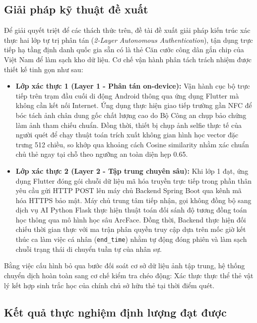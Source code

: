﻿\documentclass[../DoAn.tex]{subfiles}
\begin{document}
\subsection{Giải pháp kỹ thuật đề xuất}

Để giải quyết triệt để các thách thức trên, đề tài đề xuất giải pháp kiến trúc xác thực hai lớp tự trị phân tán (\textit{2-Layer Autonomous Authentication}), tận dụng trực tiếp hạ tầng định danh quốc gia sẵn có là thẻ Căn cước công dân gắn chip của Việt Nam để làm sạch kho dữ liệu. Cơ chế vận hành phân tách trách nhiệm được thiết kế tinh gọn như sau:
\begin{itemize}
    \item \textbf{Lớp xác thực 1 (Layer 1 - Phân tán on-device):} Vận hành cục bộ trực tiếp trên trạm đầu cuối di động Android thông qua ứng dụng Flutter mà không cần kết nối Internet. Ứng dụng thực hiện giao tiếp trường gần NFC để bóc tách ảnh chân dung gốc chất lượng cao do Bộ Công an chụp bảo chứng làm ảnh tham chiếu chuẩn. Đồng thời, thiết bị chụp ảnh selfie thực tế của người quét để chạy thuật toán trích xuất không gian hình học vector đặc trưng 512 chiều, so khớp qua khoảng cách Cosine similarity nhằm xác chuẩn chủ thẻ ngay tại chỗ theo ngưỡng an toàn diện hẹp 0.65.
    \item \textbf{Lớp xác thực 2 (Layer 2 - Tập trung chuyên sâu):} Khi lớp 1 đạt, ứng dụng Flutter đóng gói chuỗi dữ liệu mã hóa truyền trực tiếp trong phần thân yêu cầu gửi HTTP POST lên máy chủ Backend Spring Boot qua kênh mã hóa HTTPS bảo mật. Máy chủ trung tâm tiếp nhận, gọi không đồng bộ sang dịch vụ AI Python Flask thực hiện thuật toán đối sánh độ tương đồng toán học thông qua mô hình học sâu ArcFace. Đồng thời, Backend thực hiện đối chiếu thời gian thực với ma trận phân quyền truy cập  dựa trên mốc giờ kết thúc ca làm việc cá nhân (\texttt{end\_time}) nhằm tự động đóng phiên và làm sạch chuỗi trạng thái di chuyển tuần tự của nhân sự.
\end{itemize}

Bằng việc cấu hình bỏ qua bước đối soát cơ sở dữ liệu ảnh tập trung, hệ thống chuyển dịch hoàn toàn sang cơ chế kiểm tra chéo động: Xác thực thực thể thẻ vật lý kết hợp sinh trắc học của chính chủ sở hữu thẻ tại thời điểm quét.

\subsection{Kết quả thực nghiệm định lượng đạt được}
\end{document}
